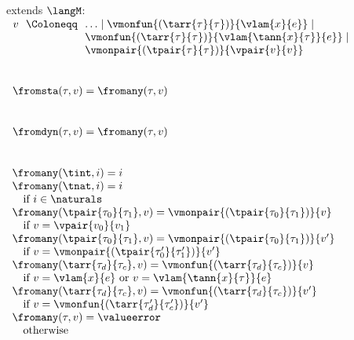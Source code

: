 \begin{flushleft}

\begin{minipage}[t]{0.5\textwidth}
 extends $\langM$:\\
$\begin{array}{l@{~~}c@{~~}l}
  v & \Coloneqq & \ldots \mid \vmonfun{(\tarr{\tau}{\tau})}{\vlam{x}{e}} \mid
\\ & & \vmonfun{(\tarr{\tau}{\tau})}{\vlam{\tann{x}{\tau}}{e}} \mid
\\ & & \vmonpair{(\tpair{\tau}{\tau})}{\vpair{v}{v}}
\end{array}$

\medskip
{}\\
$\begin{array}{l}
  \fromsta(\tau, v) = \fromany(\tau, v)
\end{array}$

\medskip
{}\\
$\begin{array}{l}
  \fromdyn(\tau, v) = \fromany(\tau, v)
\end{array}$
\end{minipage}%
\begin{minipage}[t]{0.5\textwidth}
\\
$\begin{array}{l}
  \fromany(\tint, i) = i
\\
  \fromany(\tnat, i) = i
\\ \mbox{\quad if $i \in \naturals$}
\\
  \fromany(\tpair{\tau_0}{\tau_1}, v) = \vmonpair{(\tpair{\tau_0}{\tau_1})}{v}
\\ \mbox{\quad if $v = \vpair{v_0}{v_1}$}
\\
  \fromany(\tpair{\tau_0}{\tau_1}, v) = \vmonpair{(\tpair{\tau_0}{\tau_1})}{v'}
\\ \mbox{\quad if $v = \vmonpair{(\tpair{\tau_0'}{\tau_1'})}{v'}$}
\\
  \fromany(\tarr{\tau_d}{\tau_c}, v) = \vmonfun{(\tarr{\tau_d}{\tau_c})}{v}
\\ \mbox{\quad if $v = \vlam{x}{e}$ or $v = \vlam{\tann{x}{\tau}}{e}$}
\\
  \fromany(\tarr{\tau_d}{\tau_c}, v) = \vmonfun{(\tarr{\tau_d}{\tau_c})}{v'}
\\ \mbox{\quad if $v = \vmonfun{(\tarr{\tau_d'}{\tau_c'})}{v'}$}
\\
  \fromany(\tau, v) = \valueerror
\\ \mbox{\quad otherwise}
\end{array}$
\end{minipage}


\end{flushleft}
